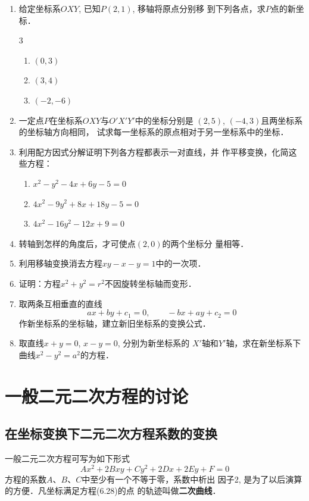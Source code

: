 \begin{enumerate}
    \item 给定坐标系$OXY$, 已知$P(2,1)$, 移轴将原点分别移
    到下列各点，求$P$点的新坐标．
\begin{multicols}{3}
    \begin{enumerate}
        \item $(0,3)$
        \item $(3,4)$
        \item $(-2,-6)$
    \end{enumerate}
\end{multicols}

    \item 一定点$P$在坐标系$OXY$与$O'X'Y'$中的坐标分别是
    $(2,5)$, $(-4,3)$且两坐标系的坐标轴方向相同，
    试求每一坐标系的原点相对于另一坐标系中的坐标．
    \item 利用配方因式分解证明下列各方程都表示一对直线，并
    作平移变换，化简这些方程：
\begin{enumerate}
\item $x^2-y^2-4x+6y-5=0$
\item $4x^2-9y^2+8x+18y-5=0$
\item $4x^2-16y^2-12x+9=0$
\end{enumerate}

    \item 转轴到怎样的角度后，才可使点$(2,0)$的两个坐标分
    量相等．
    \item 利用移轴变换消去方程$xy-x-y=1$中的一次项．
    \item 证明：方程$x^2+y^2=r^2$不因旋转坐标轴而变形．
    \item 取两条互相垂直的直线
  \[  ax+by+c_1=0,\qquad -bx+ay+c_2=0\]
    作新坐标系的坐标轴，建立新旧坐标系的变换公式．
    \item 取直线$x+y=0$, $x-y=0$, 分别为新坐标系的
    $X'$轴和$Y'$轴，求在新坐标系下曲线$x^2-y^2=a^2$的方程．
\end{enumerate}

\section{一般二元二次方程的讨论}
\subsection{在坐标变换下二元二次方程系数的变换}
一般二元二次方程可写为如下形式
\begin{equation}
    Ax^2+2Bxy+Cy^2+2Dx+2Ey+F=0
\end{equation}
方程的系数$A$、$B$、$C$中至少有一个不等于零，系数中析出
因子2, 是为了以后演算的方便．凡坐标满足方程(6.28)的点
的轨迹叫做\textbf{二次曲线}．

